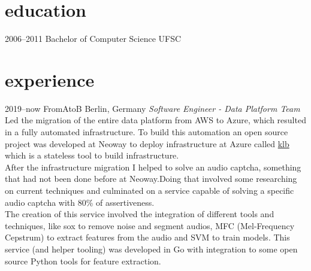 \documentclass[]{friggeri-cv} %
\begin{document}
\section{education}

\begin{entrylist}
\entry
{2006--2011}
{Bachelor of Computer Science}
{UFSC}
{}
\end{entrylist}


\section{experience}

\begin{entrylist}
\entry
{2019--now}
{FromAtoB}
{Berlin, Germany}
{\emph{Software Engineer - Data Platform Team} \\

Led the migration of the entire data platform from AWS to Azure,
which resulted in a fully automated infrastructure.
To build this automation an open source project was developed
at Neoway to deploy infrastructure at Azure called
{\href{https://github.com/NeowayLabs/klb}{klb}} which is
a stateless tool to build infrastructure.\\

After the infrastructure migration I helped to solve an
audio captcha, something that had not
been done before at Neoway.Doing that involved some researching
on current techniques and culminated on a service capable
of solving a specific audio captcha with 80\% of assertiveness.\\

The creation of this service involved the integration of different
tools and techniques, like sox to remove noise and segment audios,
MFC (Mel-Frequency Cepstrum) to extract features from the audio
and SVM to train models. This service (and helper tooling) was developed in Go
with integration to some open source Python tools for feature extraction.\\
}
\end{entrylist}
\end{document}
